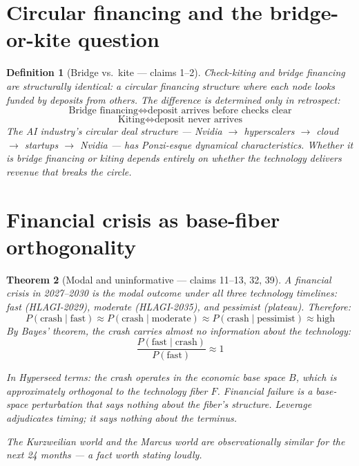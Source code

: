 \documentclass[11pt,a4paper]{article}
\newtheorem{definition}{Definition}[section]
\newtheorem{theorem}[definition]{Theorem}
\begin{document}
\section{Circular financing and the bridge-or-kite question}
\label{sec:circular}

\begin{definition}[Bridge vs.\ kite --- claims 1--2]
\label{def:bridge}
Check-kiting and bridge financing are structurally identical: a circular
financing structure where each node looks funded by deposits from others.
The difference is determined only in retrospect:
\[
  \text{Bridge financing} \iff \text{deposit arrives before checks clear}
\]
\[
  \text{Kiting} \iff \text{deposit never arrives}
\]
The AI industry's circular deal structure --- Nvidia $\to$ hyperscalers
$\to$ cloud $\to$ startups $\to$ Nvidia --- has Ponzi-esque dynamical
characteristics. Whether it is bridge financing or kiting depends entirely
on whether the technology delivers revenue that breaks the circle.
\end{definition}


\section{Financial crisis as base-fiber orthogonality}
\label{sec:crash}

\begin{theorem}[Modal and uninformative --- claims 11--13, 32, 39]
\label{thm:modal}
A financial crisis in 2027--2030 is the modal outcome under all three
technology timelines: fast (HLAGI-2029), moderate (HLAGI-2035), and
pessimist (plateau). Therefore:
\[
  P(\text{crash} \mid \text{fast}) \approx
  P(\text{crash} \mid \text{moderate}) \approx
  P(\text{crash} \mid \text{pessimist}) \approx \text{high}
\]
By Bayes' theorem, the crash carries almost no information about the
technology:
\[
  \frac{P(\text{fast} \mid \text{crash})}{P(\text{fast})} \approx 1
\]

In Hyperseed terms: the crash operates in the economic base space $B$,
which is approximately orthogonal to the technology fiber $F$. Financial
failure is a base-space perturbation that says nothing about the fiber's
structure. Leverage adjudicates timing; it says nothing about the terminus.

The Kurzweilian world and the Marcus world are observationally similar
for the next 24 months --- a fact worth stating loudly.
\end{theorem}
\end{document}
